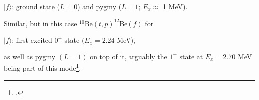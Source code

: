 \vspace{0.1cm}
\vspace{0.2cm}
\centerline{$|f\rangle$: ground state ($L=0$) and pygmy ($L=1$; $E_x\approx$ 1 MeV).}
Similar, but in this case $^{10}$Be$(t,p)^{12}$Be$(f)$ for\\
\centerline{$|f\rangle$: first excited $0^+$ state $(E_x=2.24$ MeV),}
\vspace{0.2cm}
as well as pygmy $(L=1)$ on top of it, arguably the $1^-$ state at $E_x=2.70$ MeV being part of this mode\footnote{\cite{Iwasaki:00}.}.
  \begin{subappendices}

\end{subappendices}

